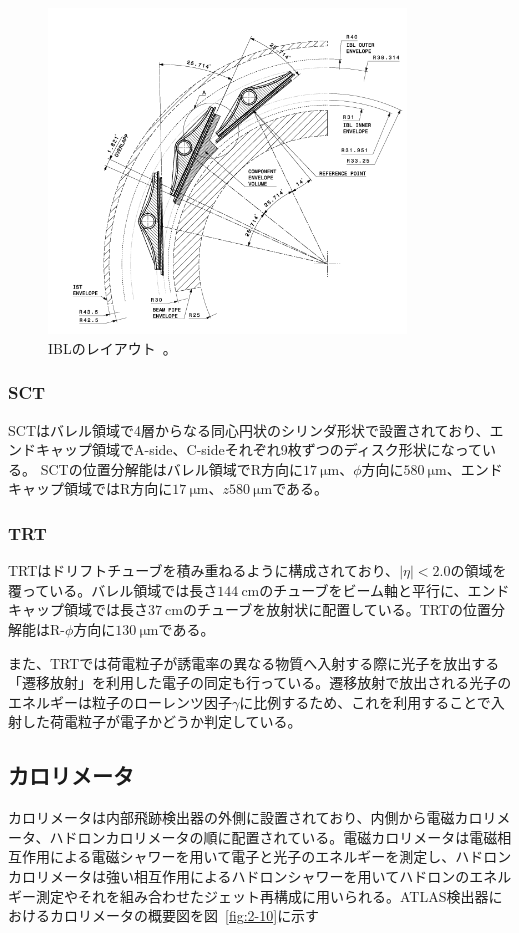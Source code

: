 \begin{figure}[h]
  \centering
  \includegraphics[clip, width=9.5cm]{fig/2/IBL_layout.png}
  \caption{IBLのレイアウト~\cite{article:ATLASBlayerTDR}。}
  \label{fig:2-9}
\end{figure}

\subsubsection{SCT}
SCTはバレル領域で4層からなる同心円状のシリンダ形状で設置されており、エンドキャップ領域でA-side、C-sideそれぞれ9枚ずつのディスク形状になっている。
SCTの位置分解能はバレル領域でR方向に$\SI{17}{\um}$、$\phi$方向に$\SI{580}{\um}$、エンドキャップ領域ではR方向に$\SI{17}{\um}$、$z$$\SI{580}{\um}$である。


\subsubsection{TRT}
TRTはドリフトチューブを積み重ねるように構成されており、$|\eta|<2.0$の領域を覆っている。バレル領域では長さ$\SI{144}{\cm}$のチューブをビーム軸と平行に、エンドキャップ領域では長さ$\SI{37}{\cm}$のチューブを放射状に配置している。TRTの位置分解能はR-$\phi$方向に$\SI{130}{\um}$である。

また、TRTでは荷電粒子が誘電率の異なる物質へ入射する際に光子を放出する「遷移放射」を利用した電子の同定も行っている。遷移放射で放出される光子のエネルギーは粒子のローレンツ因子$\gamma$に比例するため、これを利用することで入射した荷電粒子が電子かどうか判定している。

\subsection{カロリメータ}\label{2-2-4}
カロリメータは内部飛跡検出器の外側に設置されており、内側から電磁カロリメータ、ハドロンカロリメータの順に配置されている。電磁カロリメータは電磁相互作用による電磁シャワーを用いて電子と光子のエネルギーを測定し、ハドロンカロリメータは強い相互作用によるハドロンシャワーを用いてハドロンのエネルギー測定やそれを組み合わせたジェット再構成に用いられる。ATLAS検出器におけるカロリメータの概要図を図~\ref{fig:2-10}に示す

